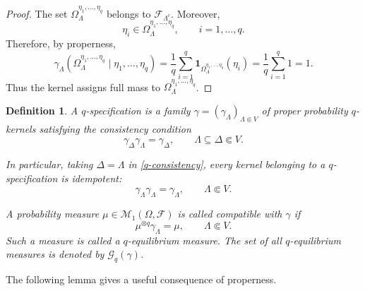 \documentclass[11pt,reqno]{amsart}
\newtheorem{defn}{Definition}
\numberwithin{equation}{section} \setcounter{tocdepth}{1}
\begin{document}
\begin{proof}
	The set
	$\Omega_\Lambda^{\eta_1,\ldots,\eta_q}$ belongs to
	$\mathcal F_{\Lambda^c}$. Moreover,
	\[
	\eta_i\in
	\Omega_\Lambda^{\eta_1,\ldots,\eta_q},
	\qquad i=1,\ldots,q.
	\]
	Therefore, by properness,
	\[
			\gamma_\Lambda
		\left(
		\Omega_\Lambda^{\eta_1,\ldots,\eta_q}
		\mid
		\eta_1,\ldots,\eta_q
		\right)=
		\frac1q
		\sum_{i=1}^q
		\mathbf 1_{\Omega_\Lambda^{\eta_1,\ldots,\eta_q}}(\eta_i)
		=
		\frac1q\sum_{i=1}^q1
		=
		1.
		\]
	Thus the kernel assigns full mass to
	$\Omega_\Lambda^{\eta_1,\ldots,\eta_q}$.
\end{proof}

\begin{defn}
	A \textit{$q$-specification} is a family $
	\gamma=(\gamma_\Lambda)_{\Lambda\Subset V}$
	of proper probability $q$-kernels satisfying the consistency condition
	\begin{equation}\label{q-consistency}
		\gamma_\Delta\gamma_\Lambda
		=
		\gamma_\Delta,
		\qquad
		\Lambda\subseteq\Delta\Subset V.
	\end{equation}
	
	In particular, taking $\Delta=\Lambda$ in \eqref{q-consistency}, every
	kernel belonging to a $q$-specification is idempotent:
	\begin{equation}\label{idempotence}
		\gamma_\Lambda\gamma_\Lambda
		=
		\gamma_\Lambda,
		\qquad
		\Lambda\Subset V.
	\end{equation}
	
	A probability measure $\mu\in\mathcal M_1(\Omega,\mathcal F)$ is called
	\textit{compatible} with $\gamma$ if
	\begin{equation}\label{DLR}
		\mu^{\otimes q}\gamma_\Lambda
		=
		\mu,
		\qquad
		\Lambda\Subset V.
	\end{equation}
	Such a measure is called a \textit{$q$-equilibrium measure}. The set of
	all $q$-equilibrium measures is denoted by $\mathcal G_q(\gamma)$.
	\end{defn}

The following lemma gives a useful consequence of properness.
\end{document}
